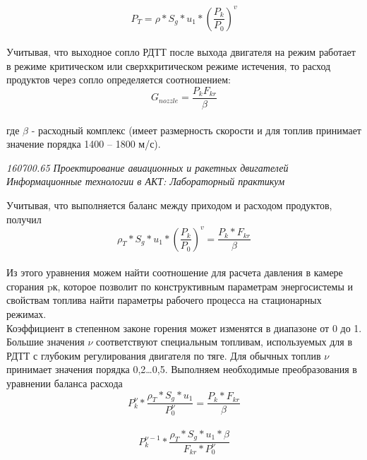\documentclass{article}
\begin{document}
\begin{equation}\label{eq:fourierrow} 
P_T = \rho * S_g *u_1 * {(\frac{P_k}{P_0})}^v
\end{equation}\\
Учитывая, что выходное сопло РДТТ после выхода двигателя на режим работает в режиме критическом или сверхкритическом режиме истечения, то расход продуктов через сопло определяется соотношением: \\
\begin{equation}\label{eq:fourierrow} 
G_{nozzle} = \frac{P_k F_{kr}}{\beta}
\end{equation}\\
где $\beta$ - расходный комплекс (имеет размерность скорости и для топлив принимает значение порядка 1400 – 1800 м/с).


\begin{flushright}
\begin{scriptsize}
\textit{160700.65   Проектирование авиационных и ракетных двигателей\\
 Информационные технологии в АКТ: Лабораторный практикум} \\
 \end{scriptsize}
\end{flushright}
Учитывая, что выполняется баланс между приходом и расходом продуктов, получил
\begin{equation}\label{eq:fourierrow} 
\rho_T * S_g * u_1 * {(\frac{P_k}{P_0})}^v = \frac{P_k * F_{kr}}{\beta}
\end{equation}\\
Из этого уравнения можем найти соотношение для расчета давления в камере сгорания pк, которое позволит по конструктивным параметрам энергосистемы и свойствам топлива найти параметры рабочего процесса на стационарных режимах.\\
Коэффициент в степенном законе горения может изменятся в диапазоне от 0 до 1. Большие значения $\nu$ соответствуют специальным топливам, используемых для в РДТТ с глубоким регулирования двигателя по тяге. Для обычных топлив $\nu$ принимает значения порядка 0,2…0,5.
Выполняем необходимые преобразования в уравнении баланса расхода
\begin{equation}\label{eq:fourierrow} 
P_k^\nu * \frac{\rho_T * S_g * u_1}{P_0^\nu } = \frac{P_k * F_{kr}}{\beta}
\end{equation}\\
\begin{equation}\label{eq:fourierrow} 
P_k^{\nu-1} * \frac{\rho_T * S_g * u_1 * \beta}{F_{kr} * P_0^\nu }
\end{equation}\
\end{document}

